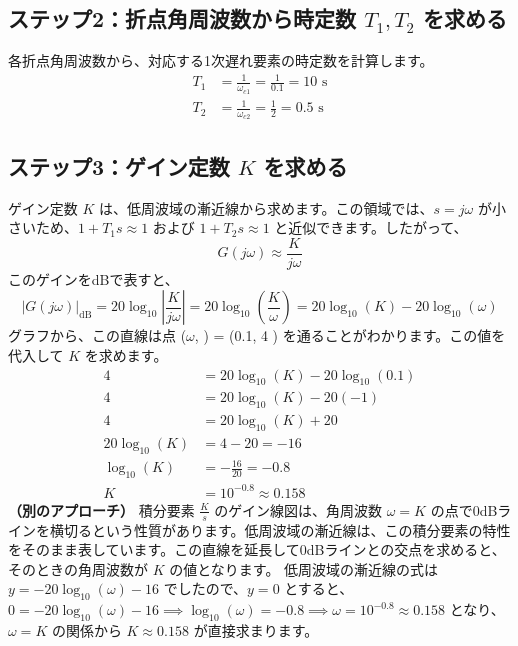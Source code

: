 \documentclass[11pt,a4paper]{ltjsarticle} %
\begin{document}
\subsection*{ステップ2：折点角周波数から時定数 $T_1, T_2$ を求める}
各折点角周波数から、対応する1次遅れ要素の時定数を計算します。
\begin{align*}
    T_1 &= \frac{1}{\omega_{c1}} = \frac{1}{0.1} = 10 \text{ s} \\
    T_2 &= \frac{1}{\omega_{c2}} = \frac{1}{2} = 0.5 \text{ s}
\end{align*}

\subsection*{ステップ3：ゲイン定数 $K$ を求める}
ゲイン定数 $K$ は、低周波域の漸近線から求めます。この領域では、$s=j\omega$ が小さいため、$1+T_1s \approx 1$ および $1+T_2s \approx 1$ と近似できます。したがって、
\begin{equation*}
    G(j\omega) \approx \frac{K}{j\omega}
\end{equation*}
このゲインをdBで表すと、
\begin{equation*}
    |G(j\omega)|_{\text{dB}} = 20\log_{10}\left|\frac{K}{j\omega}\right| = 20\log_{10}\left(\frac{K}{\omega}\right) = 20\log_{10}(K) - 20\log_{10}(\omega)
\end{equation*}
グラフから、この直線は点 ($\omega$, ) = (0.1, 4 ) を通ることがわかります。この値を代入して $K$ を求めます。
\begin{align*}
    4 &= 20\log_{10}(K) - 20\log_{10}(0.1) \\
    4 &= 20\log_{10}(K) - 20(-1) \\
    4 &= 20\log_{10}(K) + 20 \\
    20\log_{10}(K) &= 4 - 20 = -16 \\
    \log_{10}(K) &= -\frac{16}{20} = -0.8 \\
    K &= 10^{-0.8} \approx 0.158
\end{align*}
\textbf{（別のアプローチ）}
積分要素 $\frac{K}{s}$ のゲイン線図は、角周波数 $\omega=K$ の点で0dBラインを横切るという性質があります。低周波域の漸近線は、この積分要素の特性をそのまま表しています。この直線を延長して0dBラインとの交点を求めると、そのときの角周波数が $K$ の値となります。
低周波域の漸近線の式は $y = -20\log_{10}(\omega) - 16$ でしたので、$y=0$ とすると、
$0 = -20\log_{10}(\omega) - 16 \implies \log_{10}(\omega) = -0.8 \implies \omega = 10^{-0.8} \approx 0.158$
となり、$\omega=K$ の関係から $K \approx 0.158$ が直接求まります。
\end{document}
